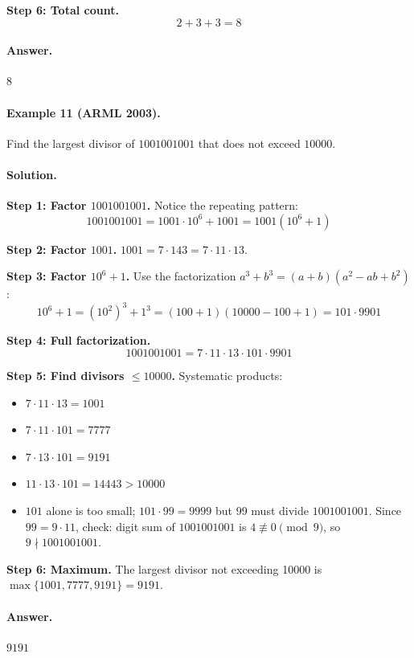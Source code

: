\documentclass[12pt]{extarticle}
\begin{document}
\textbf{Step 6: Total count.}
\[
2 + 3 + 3 = 8
\]

\paragraph{Answer.} $\boxed{8}$

\paragraph{Example 11 (ARML 2003).} Find the largest divisor of $1001001001$ that does not exceed $10000$.

\paragraph{Solution.}
\textbf{Step 1: Factor $1001001001$.} Notice the repeating pattern:
\[
1001001001 = 1001 \cdot 10^6 + 1001 = 1001(10^6 + 1)
\]

\textbf{Step 2: Factor $1001$.} $1001 = 7 \cdot 143 = 7 \cdot 11 \cdot 13$.

\textbf{Step 3: Factor $10^6 + 1$.} Use the factorization $a^3 + b^3 = (a+b)(a^2 - ab + b^2)$:
\[
10^6 + 1 = (10^2)^3 + 1^3 = (100 + 1)(10000 - 100 + 1) = 101 \cdot 9901
\]

\textbf{Step 4: Full factorization.}
\[
1001001001 = 7 \cdot 11 \cdot 13 \cdot 101 \cdot 9901
\]

\textbf{Step 5: Find divisors $\le 10000$.} Systematic products:
\begin{itemize}
    \item $7 \cdot 11 \cdot 13 = 1001$
    \item $7 \cdot 11 \cdot 101 = 7777$
    \item $7 \cdot 13 \cdot 101 = 9191$
    \item $11 \cdot 13 \cdot 101 = 14443 > 10000$
    \item $101$ alone is too small; $101 \cdot 99 = 9999$ but 99 must divide $1001001001$. Since $99 = 9 \cdot 11$, check: digit sum of $1001001001$ is $4 \not\equiv 0 \pmod{9}$, so $9 \nmid 1001001001$.
\end{itemize}

\textbf{Step 6: Maximum.} The largest divisor not exceeding 10000 is $\max\{1001, 7777, 9191\} = 9191$.

\paragraph{Answer.} $\boxed{9191}$
\end{document}
